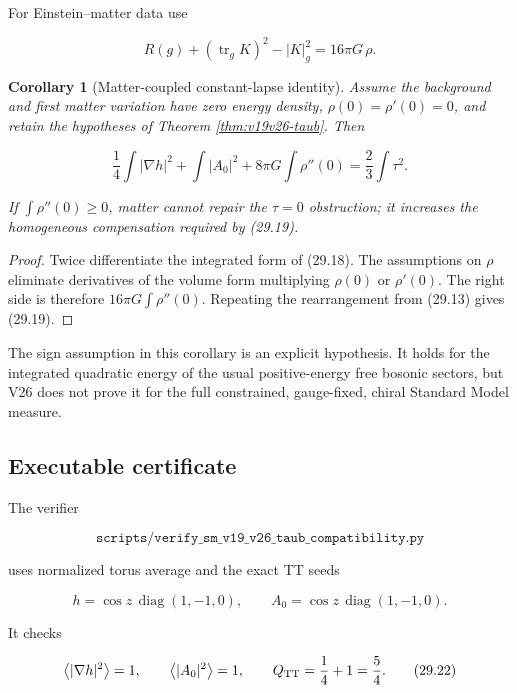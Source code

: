 \documentclass[11pt]{article}
\newtheorem{corollary}[theorem]{Corollary}
\theoremstyle{remark}
\begin{document}
For Einstein--matter data use

\[
 R(g)+(\operatorname{tr}_gK)^2-|K|_g^2
 =16\pi G\,\rho.                                               \tag{29.18}
\]

\begin{corollary}[Matter-coupled constant-lapse identity]
\label{cor:v19v26-matter}
Assume the background and first matter variation have zero energy density,
\(\rho(0)=\rho'(0)=0\), and retain the hypotheses of Theorem
\ref{thm:v19v26-taub}.  Then

\[
 \frac14\int|\nabla h|^2
 +\int|A_0|^2
 +8\pi G\int\rho''(0)
 =\frac23\int\tau^2.                                         \tag{29.19}
\]

If \(\int\rho''(0)\geq0\), matter cannot repair the
\(\tau=0\) obstruction; it increases the homogeneous compensation
required by (29.19).
\end{corollary}

\begin{proof}
Twice differentiate the integrated form of (29.18).  The assumptions on
\(\rho\) eliminate derivatives of the volume form multiplying
\(\rho(0)\) or \(\rho'(0)\).  The right side is therefore
\(16\pi G\int\rho''(0)\).  Repeating the rearrangement from (29.13) gives
(29.19).
\end{proof}

The sign assumption in this corollary is an explicit hypothesis.  It
holds for the integrated quadratic energy of the usual positive-energy
free bosonic sectors, but V26 does not prove it for the full constrained,
gauge-fixed, chiral Standard Model measure.

\subsection{Executable certificate}

The verifier

\[
 \texttt{scripts/verify\_sm\_v19\_v26\_taub\_compatibility.py} \tag{29.20}
\]

uses normalized torus average and the exact TT seeds

\[
 h=\cos z\,\operatorname{diag}(1,-1,0),\qquad
 A_0=\cos z\,\operatorname{diag}(1,-1,0).                     \tag{29.21}
\]

It checks

\[
 \left\langle|\nabla h|^2\right\rangle=1,\qquad
 \left\langle|A_0|^2\right\rangle=1,\qquad
 Q_{\rm TT}=\frac14+1=\frac54.                                \tag{29.22}
\]
\end{document}
